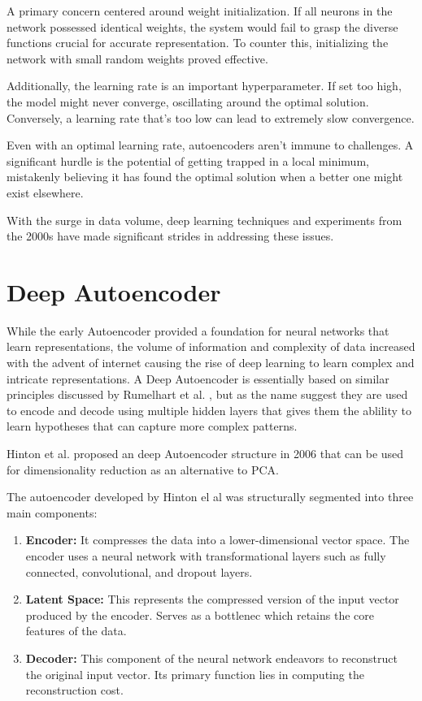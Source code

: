 \documentclass[a4paper,12pt]{Classes/RoboticsLaTeX}
\begin{document}
	A primary concern centered around weight initialization. If all neurons in the network possessed identical weights, the system would fail to grasp the diverse functions crucial for accurate representation. To counter this, initializing the network with small random weights proved effective.

	Additionally, the learning rate is an important hyperparameter. If set too high, the model might never converge, oscillating around the optimal solution. Conversely, a learning rate that's too low can lead to extremely slow convergence.

	Even with an optimal learning rate, autoencoders aren't immune to challenges. A significant hurdle is the potential of getting trapped in a local minimum, mistakenly believing it has found the optimal solution when a better one might exist elsewhere.

	With the surge in data volume, deep learning techniques and experiments from the 2000s have made significant strides in addressing these issues.


	\section{Deep Autoencoder}

	While the early Autoencoder provided a foundation for neural networks that learn representations, the volume of information and complexity of data increased with the advent of internet causing the rise of deep learning 
	to learn complex and intricate representations. A Deep Autoencoder is essentially based on similar principles discussed by Rumelhart et al. \cite{rumelhart1986}, but as the name suggest they are used to encode and decode
	using multiple hidden layers that gives them the ablility to learn hypotheses that can capture more complex patterns.

	Hinton et al. proposed an deep Autoencoder structure in 2006 that can be used for dimensionality reduction as an alternative to \ac{PCA}.

	The autoencoder developed by Hinton el al was structurally segmented into three main components:

	\begin{enumerate}
		\item \textbf{Encoder:} It compresses the data into a lower-dimensional vector space. The encoder uses a neural network with transformational layers such as fully connected,
		 convolutional, and dropout layers.
		
		\item \textbf{Latent Space:} This represents the compressed version of the input vector produced by the encoder. Serves as a bottlenec which retains the core features of
		 the data.
		
		\item \textbf{Decoder:} This component of the neural network endeavors to reconstruct the original input vector. Its primary function lies in computing 
		the reconstruction cost.
	\end{enumerate}
\end{document}
